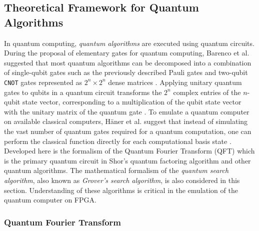 \subsection{Theoretical Framework for Quantum Algorithms \label{subsec:qft}}

In quantum computing, \textit{quantum algorithms} are executed using quantum circuits. During the proposal of elementary gates for quantum computing, Barenco et al. suggested that most quantum algorithms can be decomposed into a combination of single-qubit gates such as the previously described Pauli gates and two-qubit \texttt{CNOT} gates represented as $2^n \times 2^n$ dense matrices \cite{barenco1995elementary}. Applying unitary quantum gates to qubits in a quantum circuit transforms the $2^n$ complex entries of the $n$-qubit state vector, corresponding to a multiplication of the qubit state vector with the unitary matrix of the quantum gate \cite{li2019tackling}. To emulate a quantum computer on available classical computers, H\"{a}ner et al. suggest that instead of simulating the vast number of quantum gates required for a quantum computation, one can perform the classical function directly for each computational basis state \cite{haner2016high}. Developed here is the formalism of the Quantum Fourier Transform (QFT) which is the primary quantum circuit in Shor's quantum factoring algorithm and other quantum algorithms. The mathematical formalism of the \textit{quantum search algorithm}, also known as \textit{Grover's search algorithm}, is also considered in this section. Understanding of these algorithms is critical in the emulation of the quantum computer on FPGA. 

\subsubsection{Quantum Fourier Transform \label{subsubsec:qft}}

